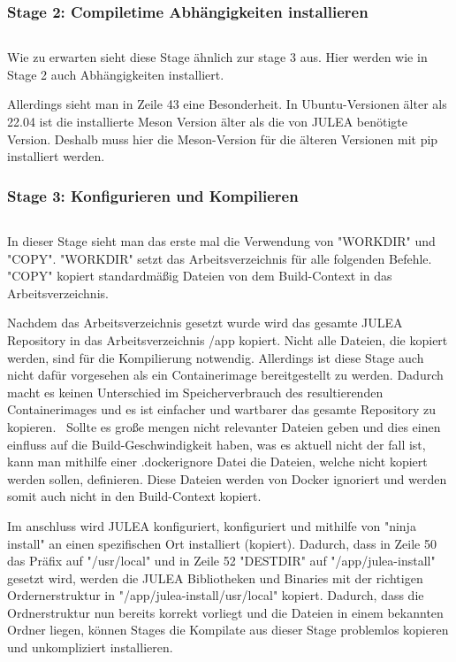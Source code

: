 \subsubsection{Stage 2: Compiletime Abhängigkeiten installieren}

\inputminted[firstline=28,lastline=43]{dockerfile}{./code-examples/Dockerfile.system}

Wie zu erwarten sieht diese Stage ähnlich zur stage 3 aus. Hier werden wie in Stage 2 auch Abhängigkeiten installiert. 

Allerdings sieht man in Zeile 43 eine Besonderheit. In Ubuntu-Versionen älter als 22.04 ist die installierte Meson Version älter als die von JULEA benötigte Version. Deshalb muss hier die Meson-Version für die älteren Versionen mit pip installiert werden. 

\subsubsection{Stage 3: Konfigurieren und Kompilieren}

\inputminted[firstline=46,lastline=52]{dockerfile}{./code-examples/Dockerfile.system}

In dieser Stage sieht man das erste mal die Verwendung von "WORKDIR" und "COPY". "WORKDIR" setzt das Arbeitsverzeichnis für alle folgenden Befehle. "COPY" kopiert standardmäßig Dateien von dem Build-Context in das Arbeitsverzeichnis.

Nachdem das Arbeitsverzeichnis gesetzt wurde wird das gesamte JULEA Repository in das Arbeitsverzeichnis /app kopiert. Nicht alle Dateien, die kopiert werden, sind für die Kompilierung notwendig. Allerdings ist diese Stage auch nicht dafür vorgesehen als ein Containerimage bereitgestellt zu werden. Dadurch macht es keinen Unterschied im Speicherverbrauch des resultierenden Containerimages und es ist einfacher und wartbarer das gesamte Repository zu kopieren. \
Sollte es große mengen nicht relevanter Dateien geben und dies einen einfluss auf die Build-Geschwindigkeit haben, was es aktuell nicht der fall ist, kann man mithilfe einer .dockerignore Datei die Dateien, welche nicht kopiert werden sollen, definieren. Diese Dateien werden von Docker ignoriert und werden somit auch nicht in den Build-Context kopiert. 

Im anschluss wird JULEA konfiguriert, konfiguriert und mithilfe von "ninja install" an einen spezifischen Ort installiert (kopiert). Dadurch, dass in Zeile 50 das Präfix auf "/usr/local" und in Zeile 52 "DESTDIR" auf "/app/julea-install" gesetzt wird, werden die JULEA Bibliotheken und Binaries mit der richtigen Ordernerstruktur in "/app/julea-install/usr/local" kopiert. Dadurch, dass die Ordnerstruktur nun bereits korrekt vorliegt und die Dateien in einem bekannten Ordner liegen, können Stages die Kompilate aus dieser Stage problemlos kopieren und unkompliziert installieren.

